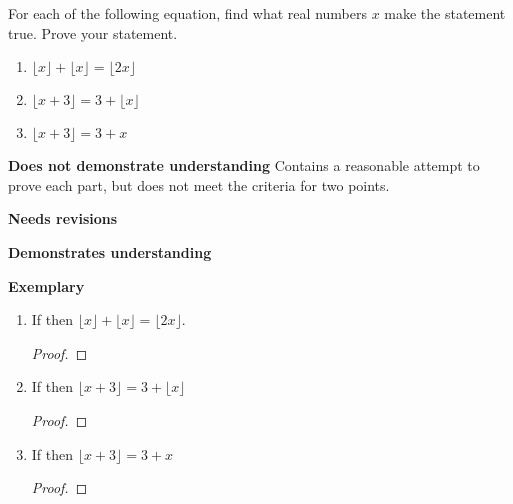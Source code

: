 \documentclass[letterpaper, 11pt]{ximera}
\begin{document}
\begin{ex}
For each of the following equation, find what real numbers $x$ make the statement true. Prove your statement. 
	\begin{enumerate}
 		\item $\lfloor x \rfloor + \lfloor x \rfloor =\lfloor 2x\rfloor$
		\item $\lfloor x + 3 \rfloor  = 3 +\lfloor x\rfloor$
		\item $\lfloor x +3 \rfloor = 	3 + x$
	\end{enumerate} 
\end{ex}

\begin{writeRubric}
    \item \textbf{Does not demonstrate understanding}
     Contains a reasonable attempt to prove each part, but does not meet the criteria for two points.
    \item \textbf{Needs revisions}
     
    \item \textbf{Demonstrates understanding}
    
    \item \textbf{Exemplary}
        
\end{writeRubric}
                                       
\begin{solution}
 	\begin{enumerate}
 		\item If %
		then $\lfloor x \rfloor + \lfloor x \rfloor =\lfloor 2x\rfloor$.
		
			\begin{proof}
			
			\end{proof}
		\item If %
		then $\lfloor x + 3 \rfloor  = 3 +\lfloor x\rfloor$

			\begin{proof}
			
			\end{proof}
		\item If %
		then $\lfloor x +3 \rfloor = 	3 + x$
			\begin{proof}
			
			\end{proof}
	\end{enumerate} 
\end{solution}
	
\end{document}
